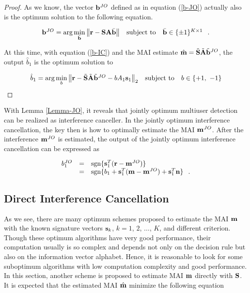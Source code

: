 \documentclass[a4paper,12pt,fleqn]{article}
\newcommand{\br}{{\mathbf r}}
\newcommand{\bA}{{\mathbf A}}
\newcommand{\bb}{{\bf b}}
\newcommand{\bs}{{\bf s}}
\newcommand{\bn}{{\bf n}}
\newcommand{\bm}{{\bf m}}
\newcommand{\bS}{{\bf S}}
\begin{document}
\begin{proof}
As we know, the vector $\bb^{JO}$ defined as in equation
(\ref{b-JO}) actually also is the optimum solution to the
following equation.

\begin{equation}
\begin{array}{rcl}
\bb^{JO}=\mbox{arg}\min\limits_{\bar{\bb}}\left\|\br-\bS\bA\bar{\bb}\right\|&\mbox{subject
to}&\bar{\bb}\in\{\pm 1\}^{K\times 1}\hspace{0.1in}.
\end{array}\label{b-JO2}
\end{equation}

At this time, with equation (\ref{b-IC}) and the MAI estimate
$\hat{\bm}=\tilde{\bS}\tilde{\bA}\tilde{\bb}^{JO}$, the output
$\hat{b}_1$ is the optimum solution to

\begin{equation}
\begin{array}{rcl}
\hat{b}_1=\mbox{arg}\min\limits_{b}\left\|\br-\tilde{\bS}\tilde{\bA}\tilde{\bb}^{JO}-bA_1\bs_1\right\|_2&\mbox{subject
to}&b\in\{+1,\ -1\}
\end{array}
\end{equation}

\end{proof}

With Lemma \ref{Lemma-JO}, it reveals that jointly optimum
multiuser detection can be realized as interference canceller. In
the jointly optimum interference cancellation, the key then is how
to optimally estimate the MAI $\bm^{JO}$. After the interference
$\bm^{JO}$ is estimated, the output of the jointly optimum
interference cancellation can be expressed as

\begin{equation}
\begin{array}{rcl}
b_1^{JO}&=&\mbox{sgn}\{\bs_1^T(\br-\bm^{JO})\}\\
&=&\mbox{sgn}\{b_1+\bs_1^T(\bm-\bm^{JO})+\bs_1^T\bn\}\hspace{0.1in}.
\end{array}\label{b-JO-IC}
\end{equation}

\subsection{Direct Interference Cancellation}

As we see, there are many optimum schemes proposed to estimate the
MAI $\bm$ with the known signature vectors $\bs_k$, $k=1$, $2$,
$\ldots$, $K$, and different criterion. Though these optimum
algorithms have very good performance, their computation usually
is so complex and depends not only on the decision rule but also
on the information vector alphabet. Hence, it is reasonable to
look for some suboptimum algorithms with low computation
complexity and good performance. In this section, another scheme
is proposed to estimate MAI $\bm$ directly with $\bS$. It is
expected that the estimated MAI $\hat{\bm}$ minimize the following
equation
\end{document}
